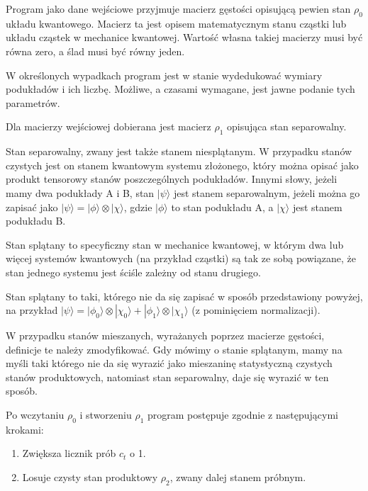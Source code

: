 \documentclass[11pt, a4paper]{article}
\begin{document}
\begin{sloppypar}
    Program jako dane wejściowe przyjmuje macierz gęstości opisującą pewien stan
    $\rho_{0}$ układu kwantowego. Macierz ta jest opisem matematycznym stanu cząstki lub
    układu cząstek w mechanice kwantowej. Wartość własna takiej macierzy musi być równa
    zero, a ślad musi być równy jeden.

    W określonych wypadkach program jest w stanie wydedukować wymiary podukładów i ich liczbę.
    Możliwe, a czasami wymagane, jest jawne podanie tych parametrów.

    Dla macierzy wejściowej dobierana jest macierz $\rho_{1}$ opisująca stan separowalny.

    Stan separowalny, zwany jest także stanem niesplątanym. W przypadku stanów czystych
    jest on stanem kwantowym systemu złożonego, który można opisać jako produkt tensorowy
    stanów poszczególnych podukładów. Innymi słowy, jeżeli mamy dwa podukłady A i B,
    stan $|\psi \rangle$ jest stanem separowalnym, jeżeli można go zapisać jako $|\psi\rangle
    = |\phi\rangle \otimes |\chi\rangle$, gdzie $| \phi\rangle$ to stan podukładu A, a $|
    \chi\rangle$ jest stanem podukładu B.

    Stan splątany to specyficzny stan w mechanice kwantowej, w którym dwa lub więcej
    systemów kwantowych (na przykład cząstki) są tak ze sobą powiązane, że stan jednego systemu
    jest ściśle zależny od stanu drugiego.

    Stan splątany to taki, którego nie da się zapisać w sposób przedstawiony powyżej, na
    przykład $|\psi\rangle = |\phi_{0}\rangle \otimes |\chi_{0}\rangle + |\phi_{1}\rangle
    \otimes |\chi_{1}\rangle$ (z pominięciem normalizacji).

    W przypadku stanów mieszanych, wyrażanych poprzez macierze gęstości, definicje te należy
    zmodyfikować. Gdy mówimy o stanie splątanym, mamy na myśli taki którego nie da się wyrazić
    jako mieszaninę statystyczną czystych stanów produktowych, natomiast stan
    separowalny, daje się wyrazić w ten sposób.

    Po wczytaniu $\rho_{0}$ i stworzeniu $\rho_{1}$ program postępuje zgodnie z następującymi
    krokami:

    \begin{enumerate}
      \item Zwiększa licznik prób $c_{t}$ o 1.

      \item Losuje czysty stan produktowy $\rho_{2}$, zwany dalej stanem próbnym.


\end{enumerate}
\end{sloppypar}
\end{document}
